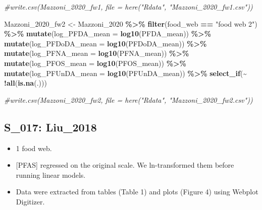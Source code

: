 \documentclass[
]{article}
\newenvironment{Shaded}{\begin{snugshade}}{\end{snugshade}}
\newcommand{\AttributeTok}[1]{\textcolor[rgb]{0.13,0.29,0.53}{#1}}
\newcommand{\CommentTok}[1]{\textcolor[rgb]{0.56,0.35,0.01}{\textit{#1}}}
\newcommand{\FunctionTok}[1]{\textcolor[rgb]{0.13,0.29,0.53}{\textbf{#1}}}
\newcommand{\NormalTok}[1]{#1}
\newcommand{\OtherTok}[1]{\textcolor[rgb]{0.56,0.35,0.01}{#1}}
\newcommand{\SpecialCharTok}[1]{\textcolor[rgb]{0.81,0.36,0.00}{\textbf{#1}}}
\newcommand{\StringTok}[1]{\textcolor[rgb]{0.31,0.60,0.02}{#1}}
\providecommand{\tightlist}{%
  \setlength{\itemsep}{0pt}\setlength{\parskip}{0pt}}
\begin{document}
\begin{Shaded}
\begin{Highlighting}[]
\CommentTok{\#write.csv(Mazzoni\_2020\_fw1, file = here("Rdata", "Mazzoni\_2020\_fw1.csv"))}
  
\NormalTok{Mazzoni\_2020\_fw2 }\OtherTok{\textless{}{-}}\NormalTok{ Mazzoni\_2020 }\SpecialCharTok{\%\textgreater{}\%} 
  \FunctionTok{filter}\NormalTok{(food\_web }\SpecialCharTok{==} \StringTok{"food web 2"}\NormalTok{) }\SpecialCharTok{\%\textgreater{}\%}
  \FunctionTok{mutate}\NormalTok{(}\AttributeTok{log\_PFDA\_mean =} \FunctionTok{log10}\NormalTok{(PFDA\_mean)) }\SpecialCharTok{\%\textgreater{}\%}
  \FunctionTok{mutate}\NormalTok{(}\AttributeTok{log\_PFDoDA\_mean =} \FunctionTok{log10}\NormalTok{(PFDoDA\_mean)) }\SpecialCharTok{\%\textgreater{}\%}
  \FunctionTok{mutate}\NormalTok{(}\AttributeTok{log\_PFNA\_mean =} \FunctionTok{log10}\NormalTok{(PFNA\_mean)) }\SpecialCharTok{\%\textgreater{}\%}
  \FunctionTok{mutate}\NormalTok{(}\AttributeTok{log\_PFOS\_mean =} \FunctionTok{log10}\NormalTok{(PFOS\_mean)) }\SpecialCharTok{\%\textgreater{}\%}
  \FunctionTok{mutate}\NormalTok{(}\AttributeTok{log\_PFUnDA\_mean =} \FunctionTok{log10}\NormalTok{(PFUnDA\_mean)) }\SpecialCharTok{\%\textgreater{}\%}
  \FunctionTok{select\_if}\NormalTok{(}\SpecialCharTok{\textasciitilde{}} \SpecialCharTok{!}\FunctionTok{all}\NormalTok{(}\FunctionTok{is.na}\NormalTok{(.)))}

\CommentTok{\#write.csv(Mazzoni\_2020\_fw2, file = here("Rdata", "Mazzoni\_2020\_fw2.csv"))}
\end{Highlighting}
\end{Shaded}

\subsection{S\_017: Liu\_2018}\label{s_017-liu_2018}

\begin{itemize}
\tightlist
\item
  1 food web.
\item
  {[}PFAS{]} regressed on the original scale. We ln-transformed them
  before running linear models.
\item
  Data were extracted from tables (Table 1) and plots (Figure 4) using
  Webplot Digitizer.
\end{itemize}
\end{document}
